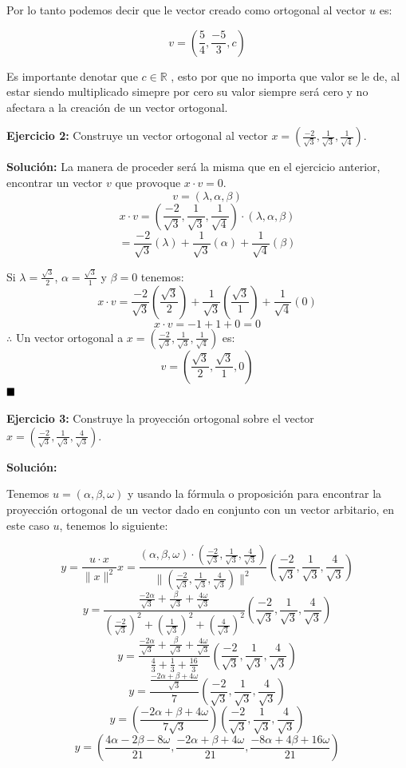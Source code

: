 \documentclass{article}
\begin{document}
Por lo tanto podemos decir que le vector creado como ortogonal al vector $u$ es: 

$$v = (\frac{5}{4}, \frac{-5}{3}, c)$$ 

Es importante denotar que $c \in \mathbb{R}$ , esto por que no importa que valor se le de,
 al estar siendo multiplicado simepre por cero su valor siempre será cero y no afectara a la creación de un vector ortogonal.
\vspace{10pt}

\textbf{Ejercicio 2: } Construye un vector ortogonal al vector $x = (\frac{-2}{\sqrt{3}}, \frac{1}{\sqrt{3}}, \frac{1}{\sqrt{4}})$.
\vspace{10pt}

\textbf{Solución:}
\vspace{10pt}
La manera de proceder será la misma que en el ejercicio anterior, encontrar un vector $v$ que provoque $x \cdot v = 0 $.
$$v = (\lambda, \alpha, \beta)$$
$$x \cdot v = (\frac{-2}{\sqrt{3}}, \frac{1}{\sqrt{3}}, \frac{1}{\sqrt{4}}) \cdot (\lambda, \alpha, \beta)$$
$$ = \frac{-2}{\sqrt{3}}(\lambda)+ \frac{1}{\sqrt{3}} (\alpha)+\frac{1}{\sqrt{4}}(\beta)$$

Si $\lambda=\frac{\sqrt{3}}{2}$, $\alpha = \frac{\sqrt{3}}{1}$ y $\beta = 0$ tenemos: 
$$ x\cdot v= \frac{-2}{\sqrt{3}}(\frac{\sqrt{3}}{2})+ \frac{1}{\sqrt{3}} (\frac{\sqrt{3}}{1})+\frac{1}{\sqrt{4}}(0)$$
$$ x\cdot v= -1+ 1+0 = 0$$
$\therefore$ Un vector ortogonal a $x = (\frac{-2}{\sqrt{3}}, \frac{1}{\sqrt{3}}, \frac{1}{\sqrt{4}})$ es:
$$v = (\frac{\sqrt{3}}{2}, \frac{\sqrt{3}}{1}, 0)$$
$\hfill\blacksquare$
\vspace{10pt}

\textbf{Ejercicio 3:} Construye la proyección ortogonal sobre el vector $x = (\frac{-2}{\sqrt{3}}, \frac{1}{\sqrt{3}}, \frac{4}{\sqrt{3}})$.
\vspace{10pt}

\textbf{Solución:} 
\vspace{10pt}

Tenemos $u = (\alpha, \beta , \omega)$ y usando la fórmula o proposición para encontrar la proyección ortogonal de un vector dado en 
conjunto con un vector arbitario, en este caso $u$, tenemos lo siguiente:

$$y =\frac{u \cdot x }{\|x\|^2} x = \frac{(\alpha, \beta , \omega)\cdot (\frac{-2}{\sqrt{3}}, \frac{1}{\sqrt{3}}, \frac{4}{\sqrt{3}})}{\|(\frac{-2}{\sqrt{3}}, \frac{1}{\sqrt{3}}, \frac{4}{\sqrt{3}})\|^2}(\frac{-2}{\sqrt{3}}, \frac{1}{\sqrt{3}}, \frac{4}{\sqrt{3}})$$
$$y = \frac{\frac{-2\alpha}{\sqrt{3}}+\frac{\beta}{\sqrt{3}}+ \frac{4\omega}{\sqrt{3}}}{(\frac{-2}{\sqrt{3}})^2+(\frac{1}{\sqrt{3}})^2+ (\frac{4}{\sqrt{3}})^2}(\frac{-2}{\sqrt{3}}, \frac{1}{\sqrt{3}}, \frac{4}{\sqrt{3}})$$
$$y = \frac{\frac{-2\alpha}{\sqrt{3}}+\frac{\beta}{\sqrt{3}}+ \frac{4\omega}{\sqrt{3}}}{\frac{4}{3}+\frac{1}{3}+ \frac{16}{3}}(\frac{-2}{\sqrt{3}}, \frac{1}{\sqrt{3}}, \frac{4}{\sqrt{3}})$$
$$y = \frac{\frac{-2\alpha+\beta+4\omega}{\sqrt{3}}}{7}(\frac{-2}{\sqrt{3}}, \frac{1}{\sqrt{3}}, \frac{4}{\sqrt{3}})$$
$$y = (\frac{-2\alpha+\beta+4\omega}{7\sqrt{3}})(\frac{-2}{\sqrt{3}}, \frac{1}{\sqrt{3}}, \frac{4}{\sqrt{3}})$$
$$y = (\frac{4\alpha-2\beta-8\omega}{21}, \frac{-2\alpha+\beta+4\omega}{21}, \frac{-8\alpha+4\beta+16\omega}{21})$$
\end{document}
